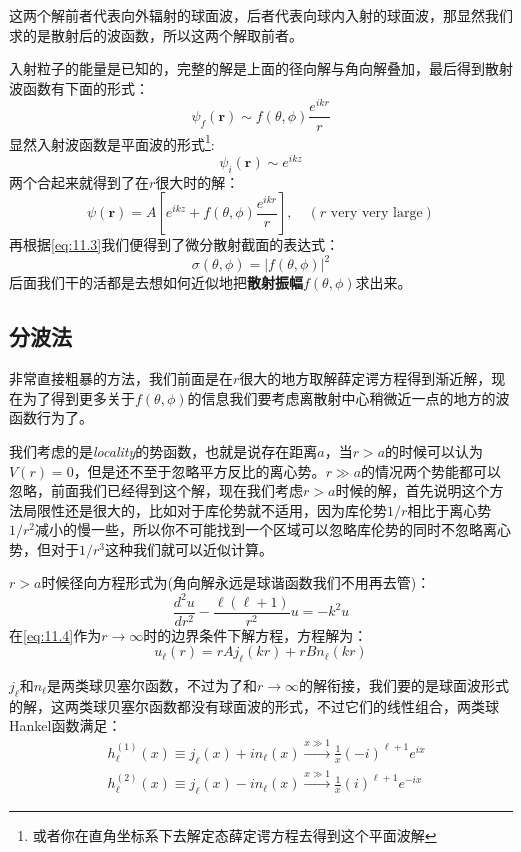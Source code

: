 \documentclass[a4paper,zihao=-4,linespread=1]{ctexrep}
\begin{document}
	这两个解前者代表向外辐射的球面波，后者代表向球内入射的球面波，那显然我们求的是散射后的波函数，所以这两个解取前者。
	
	入射粒子的能量是已知的，完整的解是上面的径向解与角向解叠加，最后得到散射波函数有下面的形式：
	\[\psi_f(\mathbf{r})\sim f(\theta,\phi)\frac{e^{ikr}}{r}\]
	显然入射波函数是平面波的形式\footnote{或者你在直角坐标系下去解定态薛定谔方程去得到这个平面波解}:
	\[\psi_i(\mathbf{r})\sim e^{ikz}\]
	两个合起来就得到了在$r$很大时的解：
	\begin{equation}
		\label{eq:11.4}
		\psi(\mathbf{r})=A\left[e^{ikz}+f(\theta,\phi)\frac{e^{ikr}}{r}\right],\quad (\text{$r$ very very large})
	\end{equation}
	再根据\ref{eq:11.3}我们便得到了微分散射截面的表达式：
	\begin{equation}
		\boxed{\sigma(\theta,\phi)=\left|f(\theta,\phi)\right|^2}
	\end{equation}
	后面我们干的活都是去想如何近似地把\textbf{散射振幅}$f(\theta,\phi)$求出来。
	\subsection{分波法}
	非常直接粗暴的方法，我们前面是在$r$很大的地方取解薛定谔方程得到渐近解，现在为了得到更多关于$f(\theta,\phi)$的信息我们要考虑离散射中心稍微近一点的地方的波函数行为了。
	
	我们考虑的是{\itshape locality}的势函数，也就是说存在距离$a$，当$r>a$的时候可以认为$V(r)=0$，但是还不至于忽略平方反比的离心势。$r\gg a$的情况两个势能都可以忽略，前面我们已经得到这个解，现在我们考虑$r>a$时候的解，首先说明这个方法局限性还是很大的，比如对于库伦势就不适用，因为库伦势$1/r$相比于离心势$1/r^2$减小的慢一些，所以你不可能找到一个区域可以忽略库伦势的同时不忽略离心势，但对于$1/r^3$这种我们就可以近似计算。
	
	$r>a$时候径向方程形式为(角向解永远是球谐函数我们不用再去管)：
	\begin{equation}
		\label{eq:11.6}
		\frac{d^2u}{dr^2}-\frac{\ell(\ell+1)}{r^2}u=-k^2u
	\end{equation}
	在\ref{eq:11.4}作为$r\to\infty$时的边界条件下解方程，方程解为：
	\[u_\ell(r)=rAj_\ell(kr)+rBn_\ell(kr)\]
	
	$j_\ell$和$n_\ell$是两类球贝塞尔函数，不过为了和$r\to\infty$的解衔接，我们要的是球面波形式的解，这两类球贝塞尔函数都没有球面波的形式，不过它们的线性组合，两类球Hankel函数满足：
	\begin{align*}
	&h^{(1)}_\ell(x)\equiv j_\ell(x)+in_\ell(x)\xrightarrow{x\gg1}\frac{1}{x}(-i)^{\ell+1}e^{ix}\\
	&h^{(2)}_\ell(x)\equiv j_\ell(x)-in_\ell(x)\xrightarrow{x\gg1}\frac{1}{x}(i)^{\ell+1}e^{-ix}
	\end{align*}
	
\end{document}
